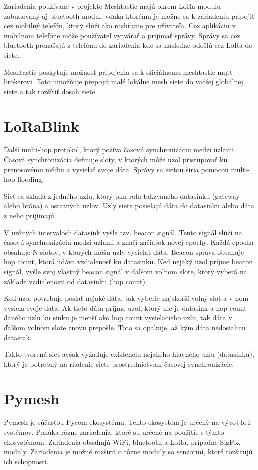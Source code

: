 \documentclass[slovak,master]{diploma}
\begin{document}
Zariadenia používane v projekte Meshtastic majú okrem LoRa modulu zabudovaný aj bluetooth modul, vďaka ktorému je možne sa k zariadeniu pripojiť cez mobilný telefón, ktorý slúži ako rozhranie pre 
užívateľa. Cez aplikáciu v mobilnom telefóne môže používateľ vytvárať a prijímať správy. Správy sa cez bluetooth prenášajú z telefónu do zariadenia kde sa následne odošlú cez 
LoRa do siete.

Meshtastic poskytuje možnosť pripojenia sa k oficiálnemu meshtastic mqtt brokerovi. Toto umožňuje prepojiť malé lokálne mesh siete do väčšej globálnej siete a 
tak rozšíriť dosah siete.

\section{LoRaBlink}
Ďalší multi-hop protokol, ktorý požíva časovú synchronizáciu medzi uzlami. Časová synchronizácia definuje sloty, v ktorých môže uzol pristupovať ku prenosovému médiu a 
vysielať svoje dáta. Správy sa sieťou šíria pomocou multi-hop flooding.

Sieť sa skladá z jedného uzlu, ktorý plní rolu takzvaného datasinku (gateway alebo brána) a ostatných uzlov. Uzly siete posielajú dáta do datasinku alebo dáta z neho prijímajú.

V určitých intervaloch datasink vyšle tzv. beacon signál. Tento signál slúži na časovú synchronizáciu medzi uzlami a značí začiatok novej epochy. 
Každá epocha obsahuje N slotov, v ktorých môžu uzly vysielať dáta. Beacon správa obsahuje hop count, ktorá udáva vzdialenosť ku datasinku.
Ked nejaký uzol príjme beacon signál, vyšle svoj vlastný beacon signál v ďalšom volnom slote, ktorý vyberá na základe vzdialenosti od datasinku (hop count).

Ked uzol potrebuje poslať nejaké dáta, tak vyberie najskorší volný slot a v nom vysiela svoje dáta. Ak tieto dáta príjme uzol, ktorý nie je datasink a 
hop count daného uzlu ku sinku je menší ako hop count vysielacieho uzlu, tak dáta v ďalšom volnom slote znovu prepošle. Toto sa opakuje, až 
kým dáta nedosiahnu datasink.

Takto tvorená sieť avšak vyžaduje existenciu nejakého hlavného uzlu (datasinku), ktorý je potrebný na riadenie siete prostredníctvom časovej synchronizácie.

\section{Pymesh}
Pymesh je súčasťou Pycom \cite{pycom} ekosystému. Tento ekosystém je určený na vývoj IoT systémov. Ponúka rôzne zariadenia, ktoré su určené na použitie s týmto 
ekosystémom. Zariadenia obsahujú WiFi, bluetooth a LoRa, prípadne SigFox moduly. Zariadenia je možné rozšíriť o rôzne moduly so senzormi, ktoré rozširujú ich schopnosti.
\end{document}
